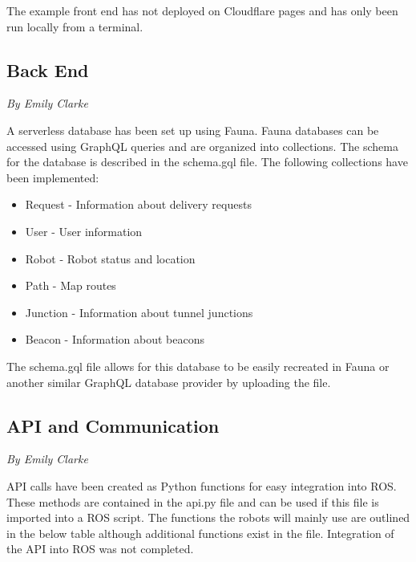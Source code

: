 \documentclass[12pt]{report}
\newcommand{\sectionAuthor}[1]{{\small\vspace{-1em}\textit{#1}}\bigskip\par}
\begin{document}
The example front end has not deployed on Cloudflare pages and has only been run locally from a terminal.

\subsection{Back End}
\sectionAuthor{By Emily Clarke}
A serverless database has been set up using Fauna. Fauna databases can be accessed using GraphQL queries and are organized into collections. The schema for the database is described in the schema.gql file. The following collections have been implemented:
\begin{itemize}
\itemsep0em 
\item Request - Information about delivery requests
\item User - User information
\item Robot - Robot status and location
\item Path - Map routes
\item Junction - Information about tunnel junctions
\item Beacon - Information about beacons
\end{itemize}

The schema.gql file allows for this database to be easily recreated in Fauna or another similar GraphQL database provider by uploading the file.

\subsection{API and Communication}
\sectionAuthor{By Emily Clarke}
API calls have been created as Python functions for easy integration into ROS. These methods are contained in the api.py file and can be used if this file is imported into a ROS script. The functions the robots will mainly use are outlined in the below table although additional functions exist in the file. Integration of the API into ROS was not completed.
\end{document}
